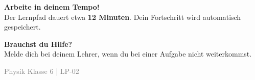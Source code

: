\documentclass[11pt, a4paper]{article}
\begin{document}
\vspace{1em}


\begin{tcolorbox}[
    colback=erfolg!10,
    colframe=erfolg,
    boxrule=1.5pt,
    arc=0pt
]
\textbf{\textcolor{erfolg}{Arbeite in deinem Tempo!}}\\[0.3em]
Der Lernpfad dauert etwa \textbf{12 Minuten}. Dein Fortschritt wird automatisch gespeichert.
\end{tcolorbox}

\vspace{1em}


\begin{tcolorbox}[
    colback=warnung-hell,
    colframe=warnung,
    boxrule=1.5pt,
    arc=0pt
]
\textbf{\textcolor{warnung}{Brauchst du Hilfe?}}\\[0.3em]
Melde dich bei deinem Lehrer, wenn du bei einer Aufgabe nicht weiterkommst.
\end{tcolorbox}

\vfill


\begin{center}
\textcolor{gray}{\small Physik Klasse 6 | LP-02}
\end{center}
\end{document}
